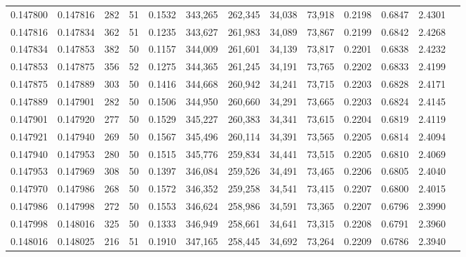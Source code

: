\begin{tabular}{rrrrrrrrrrrrr}
0.147800 & 0.147816 &   282 &  51 &                                     0.1532 & 343,265 & 262,345 &  34,038 &  73,918 & 0.2198 & 0.6847 & 2.4301 \\
0.147816 & 0.147834 &   362 &  51 &                                     0.1235 & 343,627 & 261,983 &  34,089 &  73,867 & 0.2199 & 0.6842 & 2.4268 \\
0.147834 & 0.147853 &   382 &  50 &                                     0.1157 & 344,009 & 261,601 &  34,139 &  73,817 & 0.2201 & 0.6838 & 2.4232 \\
0.147853 & 0.147875 &   356 &  52 &                                     0.1275 & 344,365 & 261,245 &  34,191 &  73,765 & 0.2202 & 0.6833 & 2.4199 \\
0.147875 & 0.147889 &   303 &  50 &                                     0.1416 & 344,668 & 260,942 &  34,241 &  73,715 & 0.2203 & 0.6828 & 2.4171 \\
0.147889 & 0.147901 &   282 &  50 &                                     0.1506 & 344,950 & 260,660 &  34,291 &  73,665 & 0.2203 & 0.6824 & 2.4145 \\
0.147901 & 0.147920 &   277 &  50 &                                     0.1529 & 345,227 & 260,383 &  34,341 &  73,615 & 0.2204 & 0.6819 & 2.4119 \\
0.147921 & 0.147940 &   269 &  50 &                                     0.1567 & 345,496 & 260,114 &  34,391 &  73,565 & 0.2205 & 0.6814 & 2.4094 \\
0.147940 & 0.147953 &   280 &  50 &                                     0.1515 & 345,776 & 259,834 &  34,441 &  73,515 & 0.2205 & 0.6810 & 2.4069 \\
0.147953 & 0.147969 &   308 &  50 &                                     0.1397 & 346,084 & 259,526 &  34,491 &  73,465 & 0.2206 & 0.6805 & 2.4040 \\
0.147970 & 0.147986 &   268 &  50 &                                     0.1572 & 346,352 & 259,258 &  34,541 &  73,415 & 0.2207 & 0.6800 & 2.4015 \\
0.147986 & 0.147998 &   272 &  50 &                                     0.1553 & 346,624 & 258,986 &  34,591 &  73,365 & 0.2207 & 0.6796 & 2.3990 \\
0.147998 & 0.148016 &   325 &  50 &                                     0.1333 & 346,949 & 258,661 &  34,641 &  73,315 & 0.2208 & 0.6791 & 2.3960 \\
0.148016 & 0.148025 &   216 &  51 &                                     0.1910 & 347,165 & 258,445 &  34,692 &  73,264 & 0.2209 & 0.6786 & 2.3940 \\

\end{tabular}
